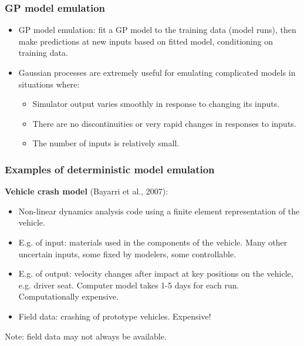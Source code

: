 \documentclass{beamer}
\begin{document}
\begin{frame}
  \frametitle{GP model emulation }
\begin{itemize}
\item GP model emulation: fit a GP model to the training data (model runs), then
  make predictions at new inputs based on fitted model, conditioning
  on training data.
\end{itemize}
\begin{itemize}
\item Gaussian processes are extremely useful for emulating complicated models in situations where: 
\begin{itemize}
\item Simulator output varies smoothly in response to
  changing its inputs.
\item There are no discontinuities or very rapid changes in responses
  to inputs.
\item The number of inputs is relatively small.
\end{itemize}
\end{itemize}
\end{frame}


\begin{frame}
  \frametitle{Examples of deterministic model emulation }
{\bf Vehicle crash model} (Bayarri et al., 2007):
\begin{itemize}
\item Non-linear dynamics analysis code using a finite element
  representation of the vehicle.
\item E.g. of input: materials used in the components of the
  vehicle. Many other uncertain inputs, some fixed by modelers, some
controllable.
\item E.g. of output: velocity changes after impact at key positions
  on the vehicle, e.g. driver seat. Computer model takes 1-5 days for
  each run. Computationally expensive.
\item Field data: crashing of prototype vehicles. Expensive!
\end{itemize}
Note: field data may not always be available.
\end{frame}
\end{document}
